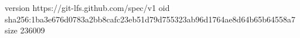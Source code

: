 version https://git-lfs.github.com/spec/v1
oid sha256:1ba3e676d0783a2bb8cafc23eb51d79d755323ab96d1764ae8d64b65b64558a7
size 236009
